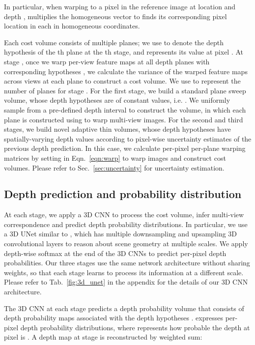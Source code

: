 In particular, when warping to a pixel in the reference image  at location  and depth , 
 multiplies the homogeneous vector  to finds its corresponding pixel location in each  in homogeneous coordinates.

Each cost volume consists of multiple planes; 
we use  to denote the depth hypothesis of the th plane at the th stage, 
and  represents its value at pixel .
At stage , 
once we warp per-view feature maps  at all depth planes with corresponding hypotheses , 
we calculate the variance of the warped feature maps across views at each plane to construct a cost volume.
We use  to represent the number of planes for stage .
For the first stage, we build a standard plane sweep volume, 
whose depth hypotheses are of constant values, i.e. .
We uniformly sample  from a pre-defined depth interval  to 
construct the volume, in which each plane is constructed using  to warp multi-view images.
For the second and third stages, we build novel adaptive thin volumes, 
whose depth hypotheses have spatially-varying depth values according to pixel-wise uncertainty estimates of the previous depth prediction.
In this case, we calculate per-pixel per-plane warping matrices by setting  in Eqn.~\ref{eqn:warp} to warp images and construct cost volumes.
Please refer to Sec.~\ref{sec:uncertainty} for uncertainty estimation.

\subsection{Depth prediction and probability distribution}
\label{sec:depth}
At each stage, we apply a 3D CNN to process the cost volume, infer multi-view correspondence and predict depth probability distributions.
In particular, we use a 3D UNet similar to \cite{yao2018mvsnet}, 
which has multiple downsampling and upsampling 3D convolutional layers
to reason about scene geometry at multiple scales.
We apply depth-wise softmax at the end of the 3D CNNs to predict per-pixel depth probabilities.
Our three stages use the same network architecture without sharing weights, 
so that each stage learns to process its information at a different scale.
Please refer to Tab.~\ref{fig:3d_unet} in the appendix for the details of our 3D CNN architecture.

The 3D CNN at each stage predicts a depth probability volume 
that consists of  depth probability maps  associated with the depth hypotheses .
 expresses per-pixel depth probability distributions, 
where  represents how probable the depth at pixel  is . 
A depth map  at stage  is reconstructed by weighted sum:



